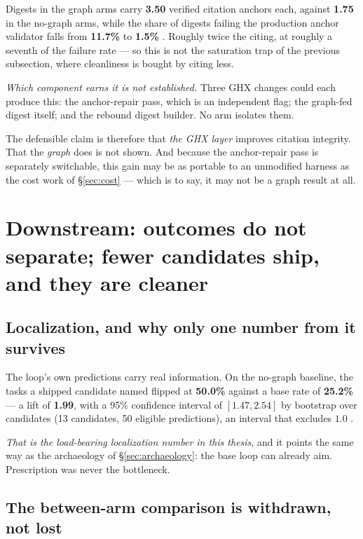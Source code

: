 Digests in the graph arms carry \textbf{3.50} verified citation anchors
each, against \textbf{1.75} in the no-graph arms, while the share of
digests failing the production anchor validator falls from \textbf{11.7\%}
to \textbf{1.5\%} . Roughly twice the citing, at roughly a seventh of
the failure rate --- so this is not the saturation trap of the previous
subsection, where cleanliness is bought by citing less.

\emph{Which component earns it is not established.} Three GHX changes could
each produce this: the anchor-repair pass, which is an independent flag;
the graph-fed digest itself; and the rebound digest builder. No arm
isolates them.

The defensible claim is therefore that \emph{the GHX layer} improves
citation integrity. That the \emph{graph} does is not shown. And because
the anchor-repair pass is separately switchable, this gain may be as
portable to an unmodified harness as the cost work of
\S\ref{sec:cost} --- which is to say, it may not be a graph result at all.

\section{Downstream: outcomes do not separate; fewer candidates ship, and
they are cleaner}
\label{sec:localization}

\subsection*{Localization, and why only one number from it survives}

The loop's own predictions carry real information. On the no-graph
baseline, the tasks a shipped candidate named flipped at \textbf{50.0\%}
against a base rate of \textbf{25.2\%} --- a lift of \textbf{1.99}, with a
95\% confidence interval of $[1.47, 2.54]$ by bootstrap over candidates (13
candidates, 50 eligible predictions), an interval that excludes $1.0$
.

\emph{That is the load-bearing localization number in this thesis}, and it
points the same way as the archaeology of \S\ref{sec:archaeology}: the base
loop can already aim. Prescription was never the bottleneck.

\subsection*{The between-arm comparison is withdrawn, not lost}

